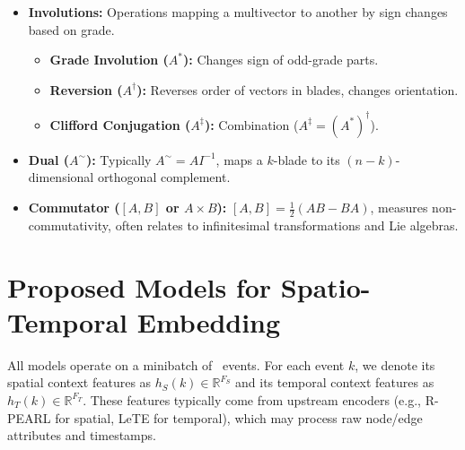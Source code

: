 \documentclass[11pt]{article}
\newcommand{\R}{\mathbb{R}}
\newcommand{\Fs}{F_S} %
\newcommand{\Ft}{F_T} %
\newcommand{\Hs}{h_S} %
\newcommand{\Ht}{h_T} %
\newcommand{\STG}{\text{CTDSTG}} %
\begin{document}
\begin{itemize}[noitemsep]
\begin{itemize}[noitemsep]
    \end{itemize}
    \item \textbf{Involutions:} Operations mapping a multivector to another by sign changes based on grade.
    \begin{itemize}[noitemsep]
        \item \textbf{Grade Involution ($A^*$):} Changes sign of odd-grade parts.
        \item \textbf{Reversion ($A^\dagger$):} Reverses order of vectors in blades, changes orientation.
        \item \textbf{Clifford Conjugation ($A^\ddagger$):} Combination ($A^\ddagger = (A^*)^\dagger$).
    \end{itemize}
    \item \textbf{Dual ($A^\sim$):} Typically $A^\sim = A I^{-1}$, maps a $k$-blade to its $(n-k)$-dimensional orthogonal complement.
    \item \textbf{Commutator ($[A,B]$ or $A \times B$):} $[A,B] = \frac{1}{2}(AB - BA)$, measures non-commutativity, often relates to infinitesimal transformations and Lie algebras.
\end{itemize}

\section{Proposed Models for Spatio-Temporal Embedding}
All models operate on a minibatch of \STG \ events. For each event $k$, we denote its spatial context features as $\Hs(k) \in \R^{\Fs}$ and its temporal context features as $\Ht(k) \in \R^{\Ft}$. These features typically come from upstream encoders (e.g., R-PEARL for spatial, LeTE for temporal), which may process raw node/edge attributes and timestamps.
\end{document}
